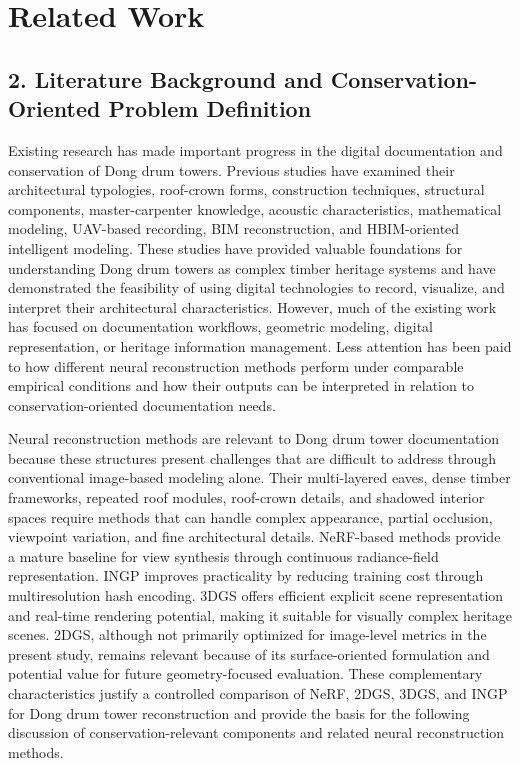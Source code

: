 \section{Related Work}\label{sec:research_background}

\subsection{\textbf{2. Literature Background and
Conservation-Oriented Problem
Definition}}\label{literature-background-and-conservation-oriented-problem-definition}

Existing research has made important progress in the digital
documentation and conservation of Dong drum towers. Previous studies
have examined their architectural typologies, roof-crown forms,
construction techniques, structural components, master-carpenter
knowledge, acoustic characteristics, mathematical modeling, UAV-based
recording, BIM reconstruction, and HBIM-oriented intelligent modeling.
These studies have provided valuable foundations for understanding Dong
drum towers as complex timber heritage systems and have demonstrated the
feasibility of using digital technologies to record, visualize, and
interpret their architectural characteristics. However, much of the
existing work has focused on documentation workflows, geometric
modeling, digital representation, or heritage information management.
Less attention has been paid to how different neural reconstruction
methods perform under comparable empirical conditions and how their
outputs can be interpreted in relation to conservation-oriented
documentation needs.

Neural reconstruction methods are relevant to Dong drum tower
documentation because these structures present challenges that are
difficult to address through conventional image-based modeling alone.
Their multi-layered eaves, dense timber frameworks, repeated roof
modules, roof-crown details, and shadowed interior spaces require
methods that can handle complex appearance, partial occlusion, viewpoint
variation, and fine architectural details. NeRF-based methods provide a
mature baseline for view synthesis through continuous radiance-field
representation. INGP improves practicality by reducing training cost
through multiresolution hash encoding. 3DGS offers efficient explicit
scene representation and real-time rendering potential, making it
suitable for visually complex heritage scenes. 2DGS, although not
primarily optimized for image-level metrics in the present study,
remains relevant because of its surface-oriented formulation and
potential value for future geometry-focused evaluation. These
complementary characteristics justify a controlled comparison of NeRF,
2DGS, 3DGS, and INGP for Dong drum tower reconstruction and provide the
basis for the following discussion of conservation-relevant components
and related neural reconstruction methods.

